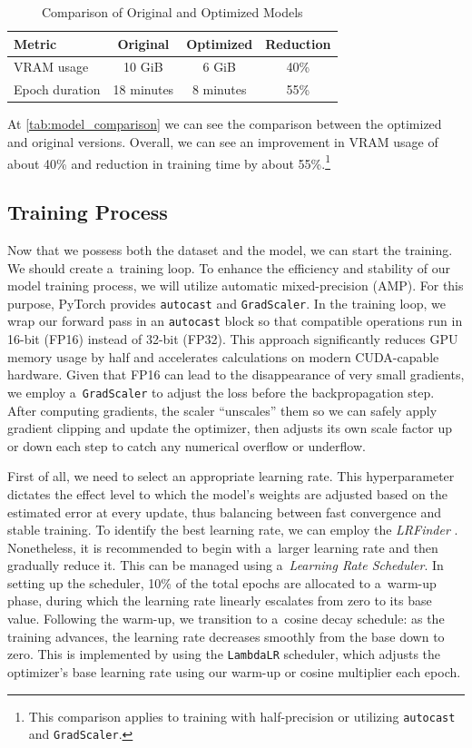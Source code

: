 \begin{table}[hbt]
\centering
\caption{Comparison of Original and Optimized Models}
\label{tab:model_comparison}
\begin{tabular}{|l|c|c|c|}
\hline
Metric & Original & Optimized & Reduction \\ \hline
VRAM usage & 10 GiB & 6 GiB & 40\% \\ \hline
Epoch duration & 18 minutes & 8 minutes & 55\% \\ \hline
\end{tabular}
\end{table}

At \autoref{tab:model_comparison} we can see the comparison between the optimized and original versions. Overall, we can see an improvement in VRAM usage of about 40\% and  reduction in training time by about 55\%.\footnote{This comparison applies to training with half-precision or utilizing \texttt{autocast} and \texttt{GradScaler}.}

\subsection*{Training Process}

Now that we possess both the dataset and the model, we can start the training. We should create a~training loop. To enhance the efficiency and stability of our model training process, we will utilize automatic mixed-precision (AMP). For this purpose, PyTorch provides \texttt{autocast} and \texttt{GradScaler}. In the training loop, we wrap our forward pass in an \texttt{autocast} block so that compatible operations run in 16-bit (FP16) instead of 32-bit (FP32). This approach significantly reduces GPU memory usage by half and accelerates calculations on modern CUDA-capable hardware. Given that FP16 can lead to the disappearance of very small gradients, we employ a~\texttt{GradScaler} to adjust the loss before the backpropagation step. After computing gradients, the scaler “unscales” them so we can safely apply gradient clipping and update the optimizer, then adjusts its own scale factor up or down each step to catch any numerical overflow or underflow.

First of all, we need to select an appropriate learning rate. This hyperparameter dictates the effect level to which the model's weights are adjusted based on the estimated error at every update, thus balancing between fast convergence and stable training. To identify the best learning rate, we can employ the \textit{LRFinder} \cite{vincent_pytorch_lr_finder}. Nonetheless, it is recommended to begin with a~larger learning rate and then gradually reduce it. This can be managed using a~\textit{Learning Rate Scheduler}. In setting up the scheduler, 10\% of the total epochs are allocated to a~warm-up phase, during which the learning rate linearly escalates from zero to its base value. Following the warm-up, we transition to a~cosine decay schedule: as the training advances, the learning rate decreases smoothly from the base down to zero. This is implemented by using the \texttt{LambdaLR} scheduler, which adjusts the optimizer’s base learning rate using our warm-up or cosine multiplier each epoch.


